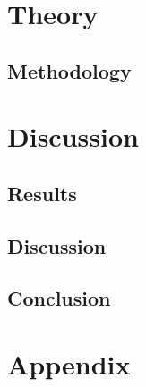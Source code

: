 \documentclass[a4paper,11pt]{report}
\begin{document}
\def\spath#1{}
\spath{Title} %

\tableofcontents








\newpage
\part{Theory}
\spath{background}


\newpage
\chapter{Methodology}


\newpage
\part{Discussion}
\chapter{Results}


\newpage
\chapter{Discussion}

\newpage
\chapter{Conclusion}

\part{Appendix}
\newpage
\printbibliography[title={Bliblyogrpah}]
\end{document}

